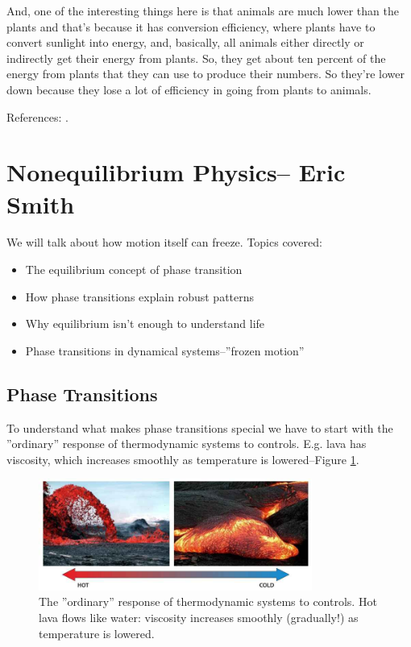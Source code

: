 \documentclass[]{article}
\begin{document}
And, one of the interesting things here
is that animals are much lower
than the plants
and that's because it has
conversion efficiency,
where plants have to convert
sunlight into energy,
and, basically, all animals
either directly or indirectly
get their energy from plants.
So, they get about ten percent
of the energy from plants
that they can use
to produce their numbers.
So they're lower down
because they lose a lot of efficiency
in going from plants to animals.

References: \cite{sibly2012metabolic,battley1987energetics,odum1976energy,odum1983systems,schmidt1997animal,brown2004toward,kempes2017thermodynamic}.

\section[Nonequilibrium Physics]{Nonequilibrium Physics-- Eric Smith}

We will talk about how motion itself can freeze. Topics covered:
\begin{itemize}
	\item The equilibrium concept of phase transition
	
	\item How phase transitions explain robust patterns
	
	\item Why equilibrium isn’t enough to understand life
	
	\item Phase transitions in dynamical systems--''frozen motion''
\end{itemize}

\subsection{Phase Transitions}

To understand what makes phase transitions special we have to start with the ''ordinary'' response of thermodynamic systems to controls. E.g. lava has viscosity, which increases smoothly as temperature is lowered--Figure \ref{fig:lava}.

\begin{figure}[H]
	\begin{center}
		\caption[The ''ordinary'' response of thermodynamic systems to controls]{The ''ordinary'' response of thermodynamic systems to controls.  Hot lava flows like water: viscosity increases smoothly (gradually!) as temperature is lowered.}\label{fig:lava}
		\includegraphics[width=0.8\textwidth]{lava}
	\end{center}
\end{figure}
\end{document}
